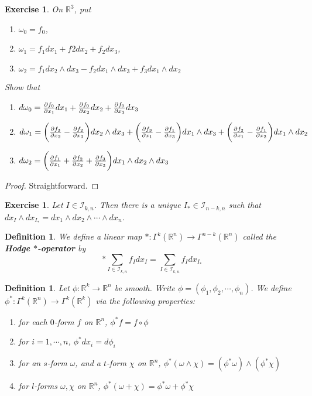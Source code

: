 \documentclass[12pt]{amsart}
\newtheorem{defn}[thm]{Definition}
\newtheorem{ex}[thm]{Exercise}
\newcommand{\om}{\omega}
\newcommand{\R}{\mathbb{R}}
\newcommand{\MI}{\mathcal{I}}
\begin{document}
	\begin{ex}
		On $\R^3$, put 
		\begin{enumerate}
			\item $\om_0 = f_0$, 
			\item $\om_1 = f_1 dx_1 + f2 dx_2 + f_2 dx_3$, 
			\item $\om_2 = f_1dx_2\wedge dx_3 - f_2 dx_1 \wedge dx_3 + f_3 dx_1 \wedge dx_2$
		\end{enumerate} 
		Show that
		\begin{enumerate}
			\item $d\om_0 = \pdv{f_0}{x_1}dx_1 + \pdv{f_0}{x_2}dx_2 + \pdv{f_0}{x_3}dx_3$
			\item $d \om_1 = \bigg(\pdv{f_3}{x_2} - \pdv{f_2}{x_3} \bigg) dx_2 \wedge dx_3 + \bigg( \pdv{f_3}{x_1} - \pdv{f_1}{x_3}\bigg)dx_1 \wedge dx_3 + \bigg( \pdv{f_2}{x_1} - \pdv{f_1}{x_2} \bigg) dx_1 \wedge dx_2$
			\item $d \om_2 = \bigg( \pdv{f_1}{x_1} + \pdv{f_2}{x_2} + \pdv{f_3}{x_3} \bigg) dx_1 \wedge dx_2 \wedge dx_3$ 
		\end{enumerate}
	\end{ex}

	\begin{proof}
		Straightforward.
	\end{proof}

	\begin{ex}
		Let $I \in \MI_{k, n}$. Then there is a unique $I_* \in \MI_{n-k, n}$ such that $dx_I \wedge dx_{I_*} = dx_1 \wedge dx_2 \wedge \cdots \wedge dx_n$.
	\end{ex}
	
	\begin{defn}
		We define a linear map $*:\Gamma^k(\R^n) \rightarrow \Gamma^{n-k}(\R^n)$ called the \textbf{Hodge $*$-operator} by $$* \sum\limits_{I \in \MI_{k,n}} f_I dx_I = \sum\limits_{I \in \MI_{k,n}} f_Idx_{I_*}$$
	\end{defn}

	\begin{defn}
		Let $\phi: \R^k \rightarrow \R^n$ be smooth. Write $\phi = (\phi_1, \phi_2, \cdots, \phi_n)$. We define $\phi^*:\Gamma^k(\R^n) \rightarrow \Gamma^k(\R^k)$ via the following properties: 
		\begin{enumerate}
			\item for each $0$-form $f$ on $\R^n$, $\phi^*f = f \circ \phi$
			\item  for $i = 1, \cdots , n$, $\phi^* dx_i = d\phi_i$ 
			\item for an $s$-form $\om$, and a $t$-form $\chi$ on $\R^n$,  $\phi^* (\om \wedge \chi) = (\phi^*\om) \wedge (\phi^*\chi)$
			\item for $l$-forms $\om, \chi$ on $\R^n$, $\phi^*(\om + \chi) = \phi^*\om + \phi^*\chi$ 
		\end{enumerate}
	\end{defn}
\end{document}
